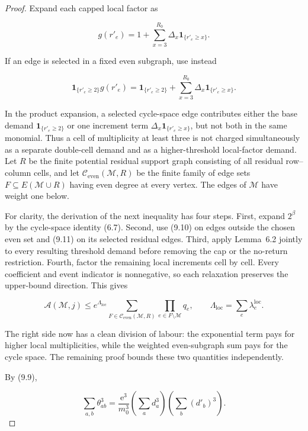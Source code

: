 \documentclass[11pt,reqno]{amsart}
\begin{document}
\begin{proof}
Expand each capped local factor as

\[
 g(r'_e)=1+\sum_{x=3}^{R_0}\Delta_x
                   \mathbf1_{\{r'_e\ge x\}}.            \tag{9.10}
\]

If an edge is selected in a fixed even subgraph, use instead

\[
 \mathbf1_{\{r'_e\ge2\}}g(r'_e)
 =\mathbf1_{\{r'_e\ge2\}}
  +\sum_{x=3}^{R_0}\Delta_x\mathbf1_{\{r'_e\ge x\}}.   \tag{9.11}
\]

In the product expansion, a selected cycle-space edge contributes either
the base demand \(\mathbf1_{\{r'_e\ge2\}}\) or one increment term
\(\Delta_x\mathbf1_{\{r'_e\ge x\}}\), but not both in the same monomial.
Thus a cell of multiplicity at least three is not charged simultaneously as
a separate double-cell demand and as a higher-threshold local-factor demand.
Let \(R\) be the finite potential residual support graph consisting of all
residual row--column cells, and let
\(\mathcal C_{\mathrm{even}}(\mathcal M,R)\) be the finite family of edge sets
\(F\subseteq E(\mathcal M\cup R)\) having even degree at every vertex.  The
edges of \(\mathcal M\) have weight one below.

For clarity, the derivation of the next inequality has four steps.  First,
expand \(2^\beta\) by the cycle-space identity (6.7).  Second, use (9.10) on
edges outside the chosen even set and (9.11) on its selected residual edges.
Third, apply Lemma~6.2 jointly to every resulting threshold demand before
removing the cap or the no-return restriction.  Fourth, factor the remaining
local increments cell by cell.  Every coefficient and event indicator is
nonnegative, so each relaxation preserves the upper-bound direction.  This
gives

\[
 \mathcal A(\mathcal M,j)
  \le e^{\Lambda_{\mathrm{loc}}}
  \sum_{F\in\mathcal C_{\mathrm{even}}(\mathcal M,R)}
       \prod_{e\in F\setminus \mathcal M}q_e,\qquad
  \Lambda_{\mathrm{loc}}=\sum_e\lambda^{\mathrm{loc}}_e.
                                                               \tag{9.12}
\]

The right side now has a clean division of labour: the exponential term pays
for higher local multiplicities, while the weighted even-subgraph sum pays
for the cycle space. The remaining proof bounds these two quantities
independently.

By (9.9),

\[
 \sum_{a,b}\theta_{ab}^3
 =\frac{\mathrm{e}^3}{m_0^3}
   \left(\sum_a d_a^3\right)\left(\sum_b(d'_b)^3\right).
\]


\end{proof}
\end{document}
